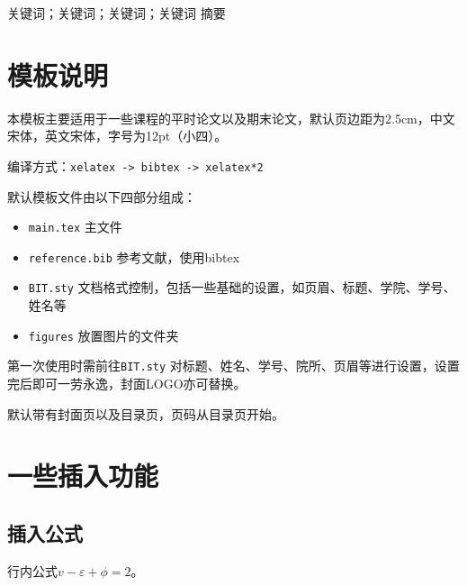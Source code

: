\documentclass[12pt,hyperref,a4paper,UTF8]{ctexart}
\begin{document}

\thispagestyle{firstpage}
\cover

\begin{cnabstract}{关键词；关键词；关键词；关键词}
摘要
%
%    
\end{cnabstract}






\section{模板说明}
本模板主要适用于一些课程的平时论文以及期末论文，默认页边距为2.5cm，中文宋体，英文宋体，字号为12pt（小四）。

编译方式：\verb|xelatex -> bibtex -> xelatex*2|


默认模板文件由以下四部分组成：
\begin{itemize}
    \item \texttt{main.tex} 主文件
    \item \texttt{reference.bib} 参考文献，使用bibtex
    \item \texttt{BIT.sty} 文档格式控制，包括一些基础的设置，如页眉、标题、学院、学号、姓名等
    \item \texttt{figures} 放置图片的文件夹
\end{itemize}

第一次使用时需前往\texttt{BIT.sty} 对标题、姓名、学号、院所、页眉等进行设置，设置完后即可一劳永逸，封面LOGO亦可替换。

默认带有封面页以及目录页，页码从目录页开始。

\section{一些插入功能}
\subsection{插入公式}
行内公式$v-\varepsilon+\phi=2$。
\end{document}
